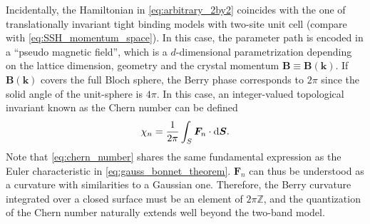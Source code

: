 Incidentally, the Hamiltonian in \cref{eq:arbitrary_2by2} coincides with the one of translationally invariant tight binding models with two-site unit cell (compare with \cref{eq:SSH_momentum_space}).
In this case, the parameter path is encoded in a ``pseudo magnetic field'', which is a $d$-dimensional parametrization depending on the lattice dimension, geometry and the crystal momentum $\bm B\equiv\bm B(\bm k)$.
If $\bm B(\bm k)$ covers the full Bloch sphere, the Berry phase corresponds to $2\pi$ since the solid angle of the unit-sphere is $4\pi$.
In this case, an integer-valued topological invariant known as the Chern number can be defined~\cite{Nakahara1990}
\begin{align}
    \chi_n = \frac1{2\pi}\int_S {\bm F_n}\cdot\mathrm d{\bm S}.
    \label{eq:chern_number}
\end{align}
Note that \cref{eq:chern_number} shares the same fundamental expression as the Euler characteristic in \cref{eq:gauss_bonnet_theorem}.
$\bm F_n$ can thus be understood as a curvature with similarities to a Gaussian one.
Therefore, the Berry curvature integrated over a closed surface must be an element of $2\pi \mathds Z$, and the quantization of the Chern number naturally extends well beyond the two-band model.

%
%
